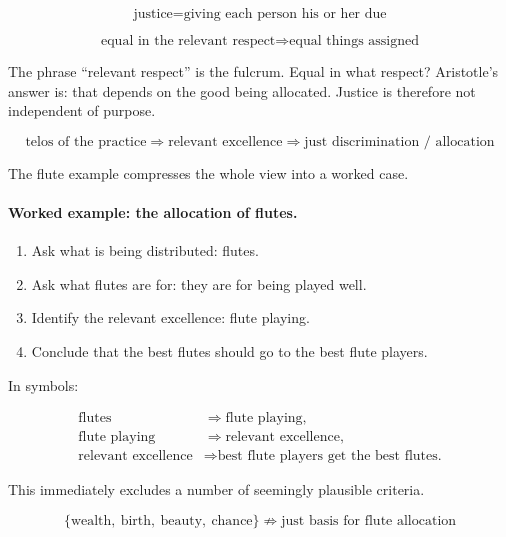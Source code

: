 \begin{equation}
\text{justice} = \text{giving each person his or her due}
\end{equation}

\begin{equation}
\text{equal in the relevant respect}
\Longrightarrow
\text{equal things assigned}
\end{equation}

The phrase ``relevant respect'' is the fulcrum. Equal in what respect? Aristotle's answer is: that depends on the good being allocated. Justice is therefore not independent of purpose.

\begin{equation}
\text{telos of the practice}
\Longrightarrow
\text{relevant excellence}
\Longrightarrow
\text{just discrimination / allocation}
\end{equation}

The flute example compresses the whole view into a worked case.

\paragraph{Worked example: the allocation of flutes.}
\begin{enumerate}
\item Ask what is being distributed: flutes.
\item Ask what flutes are for: they are for being played well.
\item Identify the relevant excellence: flute playing.
\item Conclude that the best flutes should go to the best flute players.
\end{enumerate}

In symbols:

\begin{align}
\text{flutes} &\Longrightarrow \text{flute playing},\\
\text{flute playing} &\Longrightarrow \text{relevant excellence},\\
\text{relevant excellence} &\Longrightarrow \text{best flute players get the best flutes.}
\end{align}

This immediately excludes a number of seemingly plausible criteria.

\begin{equation}
\{\text{wealth},\ \text{birth},\ \text{beauty},\ \text{chance}\}
\not\Longrightarrow
\text{just basis for flute allocation}
\end{equation}

